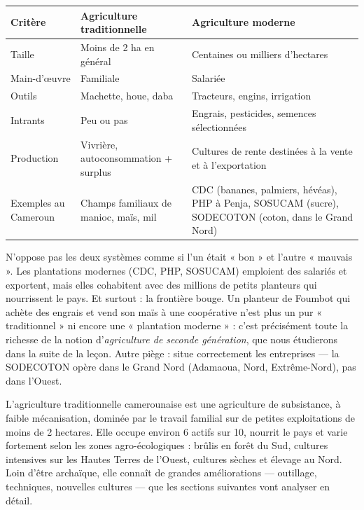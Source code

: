 \documentclass[11pt]{article}
\begin{document}
\begin{center}
\begin{tabularx}{\linewidth}{|l|X|X|}
\hline
\rowcolor{popblueL} \textbf{Critère} & \textbf{Agriculture traditionnelle} & \textbf{Agriculture moderne} \\
\hline
Taille & Moins de 2 ha en général & Centaines ou milliers d'hectares \\
\hline
Main-d'œuvre & Familiale & Salariée \\
\hline
Outils & Machette, houe, daba & Tracteurs, engins, irrigation \\
\hline
Intrants & Peu ou pas & Engrais, pesticides, semences sélectionnées \\
\hline
Production & Vivrière, autoconsommation + surplus & Cultures de rente destinées à la vente et à l'exportation \\
\hline
Exemples au Cameroun & Champs familiaux de manioc, maïs, mil & CDC (bananes, palmiers, hévéas), PHP à Penja, SOSUCAM (sucre), SODECOTON (coton, dans le Grand Nord) \\
\hline
\end{tabularx}
\end{center}

\begin{attention}
N'oppose pas les deux systèmes comme si l'un était « bon » et l'autre « mauvais ». Les plantations modernes (CDC, PHP, SOSUCAM) emploient des salariés et exportent, mais elles cohabitent avec des millions de petits planteurs qui nourrissent le pays. Et surtout : la frontière bouge. Un planteur de Foumbot qui achète des engrais et vend son maïs à une coopérative n'est plus un pur « traditionnel » ni encore une « plantation moderne » : c'est précisément toute la richesse de la notion d'\emph{agriculture de seconde génération}, que nous étudierons dans la suite de la leçon. Autre piège : situe correctement les entreprises — la SODECOTON opère dans le Grand Nord (Adamaoua, Nord, Extrême-Nord), pas dans l'Ouest.
\end{attention}

\begin{aretenir}
L'agriculture traditionnelle camerounaise est une agriculture de subsistance, à faible mécanisation, dominée par le travail familial sur de petites exploitations de moins de 2 hectares. Elle occupe environ 6 actifs sur 10, nourrit le pays et varie fortement selon les zones agro-écologiques : brûlis en forêt du Sud, cultures intensives sur les Hautes Terres de l'Ouest, cultures sèches et élevage au Nord. Loin d'être archaïque, elle connaît de grandes améliorations — outillage, techniques, nouvelles cultures — que les sections suivantes vont analyser en détail.
\end{aretenir}
\end{document}
